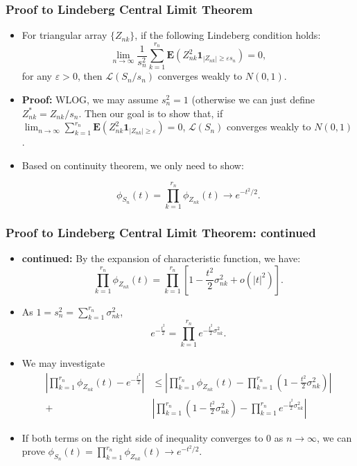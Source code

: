 \documentclass[handout]{beamer}
\newcommand{\BE}{\mathbf{E}}
\newcommand{\BI}{\mathbf{1}}
\begin{document}
     \frame
{
  \frametitle{Proof to Lindeberg Central Limit Theorem}
   \begin{itemize}

\item<1->[] \begin{Theorem} For triangular array $\{Z_{nk}\}$, if the following Lindeberg condition holds:
$$\lim_{n\rightarrow \infty} \frac{1}{s_n^2} \sum_{k=1}^{r_n} \BE(Z_{nk}^2 \BI_{|Z_{nk}|\geq \varepsilon s_n})=0,$$
for any $\varepsilon>0$, then $\mathcal{L} (S_n/s_n)$ converges weakly to $N(0,1)$.
\end{Theorem}


\item<2-> \textbf{Proof:} WLOG, we may assume $s_n^2=1$ (otherwise we can just define $Z_{nk}^*=Z_{nk}/s_n.$ Then our goal is to show that, if $\lim_{n\rightarrow \infty} \sum_{k=1}^{r_n} \BE(Z_{nk}^2 \BI_{|Z_{nk}|\geq \varepsilon })=0$, $\mathcal{L} (S_n)$ converges weakly to $N(0,1)$.

\item<3->[-] Based on continuity theorem, we only need to show:

$$\phi_{S_n} (t)=\prod_{k=1}^{r_n} \phi_{Z_{nk}}(t) \rightarrow e^{-t^2/2}.$$

\end{itemize}
}

 
      \frame
{
  \frametitle{Proof to Lindeberg Central Limit Theorem: continued}
   \begin{itemize}

\item<1->\textbf{continued:} By the expansion of characteristic function, we have:
$$\prod_{k=1}^{r_n} \phi_{Z_{nk}}(t)=\prod_{k=1}^{r_n} [1-\frac{t^2}{2} \sigma^2_{nk}+ o(|t|^2) ].$$

\item<2->[-] As $1=s_n^2=\sum_{k=1}^{r_n}\sigma_{nk}^2$, 
$$ e^{-\frac{t^2}{2}}=\prod_{k=1}^{r_n} e^{-\frac{t^2}{2}\sigma^2_{nk}}.$$

\item<3->[-] We may investigate
\begin{align*}  |\prod_{k=1}^{r_n} \phi_{Z_{nk}}(t)-e^{-\frac{t^2}{2}}|  & \leq |\prod_{k=1}^{r_n} \phi_{Z_{nk}}(t)-\prod_{k=1}^{r_n} (1-\frac{t^2}{2} \sigma^2_{nk})|\\ + &  |\prod_{k=1}^{r_n} (1-\frac{t^2}{2} \sigma^2_{nk})-\prod_{k=1}^{r_n} e^{-\frac{t^2}{2}\sigma^2_{nk}}|\end{align*}

\item<4->[-] If both terms on the right side of inequality converges to 0 as $n\rightarrow \infty$, we can prove $\phi_{S_n} (t)=\prod_{k=1}^{r_n} \phi_{Z_{nk}}(t) \rightarrow e^{-t^2/2}.$

\end{itemize}
}
\end{document}

